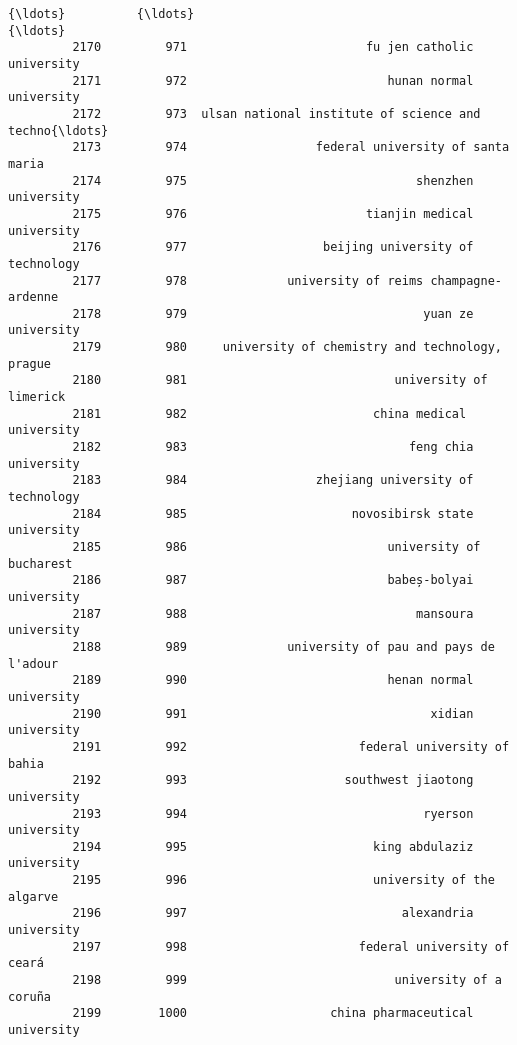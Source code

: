 \documentclass[11pt]{article}
\begin{document}
\begin{Verbatim}[commandchars=\\\{\}]
         {\ldots}          {\ldots}                                                {\ldots}   
         2170         971                         fu jen catholic university   
         2171         972                            hunan normal university   
         2172         973  ulsan national institute of science and techno{\ldots}   
         2173         974                  federal university of santa maria   
         2174         975                                shenzhen university   
         2175         976                         tianjin medical university   
         2176         977                   beijing university of technology   
         2177         978              university of reims champagne-ardenne   
         2178         979                                 yuan ze university   
         2179         980     university of chemistry and technology, prague   
         2180         981                             university of limerick   
         2181         982                          china medical university    
         2182         983                               feng chia university   
         2183         984                  zhejiang university of technology   
         2184         985                       novosibirsk state university   
         2185         986                            university of bucharest   
         2186         987                            babeș-bolyai university   
         2187         988                                mansoura university   
         2188         989              university of pau and pays de l'adour   
         2189         990                            henan normal university   
         2190         991                                  xidian university   
         2191         992                        federal university of bahia   
         2192         993                      southwest jiaotong university   
         2193         994                                 ryerson university   
         2194         995                          king abdulaziz university   
         2195         996                          university of the algarve   
         2196         997                              alexandria university   
         2197         998                        federal university of ceará   
         2198         999                             university of a coruña   
         2199        1000                    china pharmaceutical university   
         

\end{Verbatim}
\end{document}

